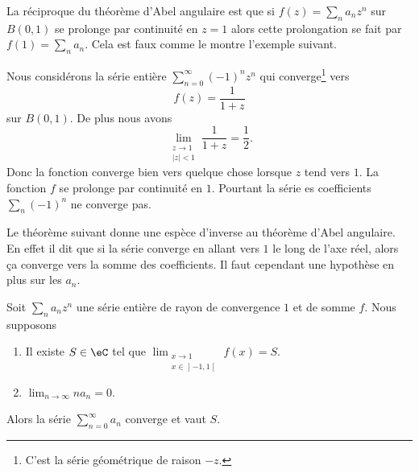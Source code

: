 La réciproque du théorème d'Abel angulaire est que si \( f(z)=\sum_na_nz^n\) sur \( B(0,1)\) se prolonge par continuité en \( z=1\) alors cette prolongation se fait par \( f(1)=\sum_na_n\). Cela est faux comme le montre l'exemple suivant.

\begin{example}
	Nous considérons la série entière \( \sum_{n=0}^{\infty}(-1)^nz^n\) qui converge\footnote{C'est la série géométrique de raison \( -z\).} vers
	\begin{equation}
		f(z)=\frac{1}{ 1+z }
	\end{equation}
	sur \( B(0,1)\). De plus nous avons
	\begin{equation}
		\lim_{\substack{z\to 1\\    | z |<1}}\frac{1}{ 1+z }=\frac{ 1 }{2}.
	\end{equation}
	Donc la fonction converge bien vers quelque chose lorsque \( z\) tend vers \( 1\). La fonction \( f\) se prolonge par continuité en \( 1\). Pourtant la série es coefficients \( \sum_n(-1)^n\) ne converge pas.
\end{example}

Le théorème suivant donne une espèce d'inverse au théorème d'Abel angulaire. En effet il dit que si la série converge  en allant vers \( 1\) le long de l'axe réel, alors ça converge vers la somme des coefficients. Il faut cependant une hypothèse en plus sur les \( a_n\).
\begin{theorem}
	Soit \( \sum_na_nz^n\) une série entière de rayon de convergence \( 1\) et de somme \( f\). Nous supposons
	\begin{enumerate}
		\item
		      Il existe \( S\in \eC\) tel que \( \lim_{\substack{x\to 1\\x\in\mathopen] -1 , 1 \mathclose[}}f(x)=S\).
		\item
		      \( \lim_{n\to \infty} na_n=0\).
	\end{enumerate}
	Alors la série \( \sum_{n=0}^{\infty}a_n\) converge et vaut \( S\).
\end{theorem}

